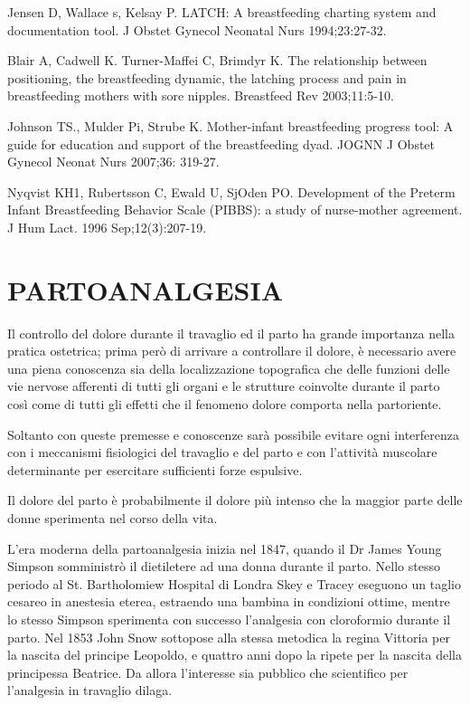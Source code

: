 \documentclass[]{article}
\begin{document}
Jensen D, Wallace s, Kelsay P. LATCH: A breastfeeding charting system
and documentation tool. J Obstet Gynecol Neonatal Nurs 1994;23:27-32.

Blair A, Cadwell K. Turner-Maffei C, Brimdyr K. The relationship between
positioning, the breastfeeding dynamic, the latching process and pain in
breastfeeding mothers with sore nipples. Breastfeed Rev 2003;11:5-10.

Johnson TS., Mulder Pi, Strube K. Mother-infant breastfeeding progress
tool: A guide for education and support of the breastfeeding dyad. JOGNN
J Obstet Gynecol Neonat Nurs 2007;36: 319-27.

Nyqvist KH1, Rubertsson C, Ewald U, SjOden PO. Development of the
Preterm Infant Breastfeeding Behavior Scale (PIBBS): a study of
nurse-mother agreement. J Hum Lact. 1996 Sep;12(3):207-19.

\hypertarget{partoanalgesia}{%
\section{PARTOANALGESIA}\label{partoanalgesia}}

Il controllo del dolore durante il travaglio ed il parto ha grande
importanza nella pratica ostetrica; prima però di arrivare a controllare
il dolore, è necessario avere una piena conoscenza sia della
localizzazione topografica che delle funzioni delle vie nervose
afferenti di tutti gli organi e le strutture coinvolte durante il parto
così come di tutti gli effetti che il fenomeno dolore comporta nella
partoriente.

Soltanto con queste premesse e conoscenze sarà possibile evitare ogni
interferenza con i meccanismi fisiologici del travaglio e del parto e
con l'attività muscolare determinante per esercitare sufficienti forze
espulsive.

Il dolore del parto è probabilmente il dolore più intenso che la maggior
parte delle donne sperimenta nel corso della vita.

L'era moderna della partoanalgesia inizia nel 1847, quando il Dr James
Young Simpson somministrò il dietiletere ad una donna durante il parto.
Nello stesso periodo al St. Bartholomiew Hospital di Londra Skey e
Tracey eseguono un taglio cesareo in anestesia eterea, estraendo una
bambina in condizioni ottime, mentre lo stesso Simpson sperimenta con
successo l'analgesia con cloroformio durante il parto. Nel 1853 John
Snow sottopose alla stessa metodica la regina Vittoria per la nascita
del principe Leopoldo, e quattro anni dopo la ripete per la nascita
della principessa Beatrice. Da allora l'interesse sia pubblico che
scientifico per l'analgesia in travaglio dilaga.
\end{document}
